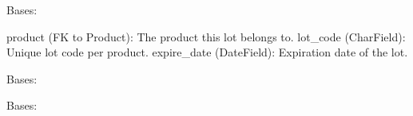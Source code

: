 \documentclass[a4paper,11pt,spanish]{sphinxmanual}
\begin{document}

\begin{fulllineitems}
\label{\detokenize{api/inventory/inventory.models:inventory.models.ProductLot}}
\pysigstartsignatures
\pysiglinewithargsret
{}
{\sphinxparamcomma {}}
{}
\pysigstopsignatures
\sphinxAtStartPar
Bases: 
\begin{description}
\sphinxAtStartPar
product (FK to Product): The product this lot belongs to.
lot\_code (CharField): Unique lot code per product.
expire\_date (DateField): Expiration date of the lot.

\end{description}

\begin{fulllineitems}
\label{\detokenize{api/inventory/inventory.models:inventory.models.ProductLot.DoesNotExist}}
\pysigstartsignatures
\pysigline
{}
\pysigstopsignatures
\sphinxAtStartPar
Bases: 

\end{fulllineitems}


\begin{fulllineitems}
\label{\detokenize{api/inventory/inventory.models:inventory.models.ProductLot.MultipleObjectsReturned}}
\pysigstartsignatures
\pysigline
{}
\pysigstopsignatures
\sphinxAtStartPar
Bases: 

\end{fulllineitems}



\end{fulllineitems}
\end{document}

